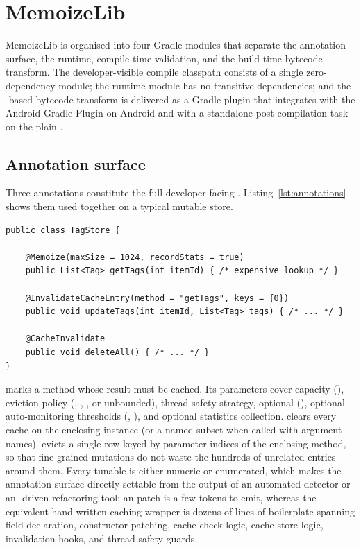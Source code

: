\section{MemoizeLib}\label{sec:tool}

MemoizeLib is organised into four Gradle modules that separate the annotation surface, the runtime, compile-time validation, and the build-time bytecode transform. The developer-visible compile classpath consists of a single zero-dependency module; the runtime module has no transitive dependencies; and the \asm-based bytecode transform is delivered as a Gradle plugin that integrates with the Android Gradle Plugin on Android and with a standalone post-compilation task on the plain \jvm.

\subsection{Annotation surface}\label{sec:annotations}

Three annotations constitute the full developer-facing \api. Listing~\ref{lst:annotations} shows them used together on a typical mutable store.

\begin{lstlisting}[caption={All three annotations used together.},label={lst:annotations}]
public class TagStore {

    @Memoize(maxSize = 1024, recordStats = true)
    public List<Tag> getTags(int itemId) { /* expensive lookup */ }

    @InvalidateCacheEntry(method = "getTags", keys = {0})
    public void updateTags(int itemId, List<Tag> tags) { /* ... */ }

    @CacheInvalidate
    public void deleteAll() { /* ... */ }
}
\end{lstlisting}

 marks a method whose result must be cached. Its parameters cover capacity (), eviction policy (, , , or unbounded), thread-safety strategy, optional \ttl (), optional auto-monitoring thresholds (, ), and optional statistics collection.  clears every cache on the enclosing instance (or a named subset when called with argument names).  evicts a single row keyed by parameter indices of the enclosing method, so that fine-grained mutations do not waste the hundreds of unrelated entries around them. Every tunable is either numeric or enumerated, which makes the annotation surface directly settable from the output of an automated detector or an \llm-driven refactoring tool: an  patch is a few tokens to emit, whereas the equivalent hand-written caching wrapper is dozens of lines of boilerplate spanning field declaration, constructor patching, cache-check logic, cache-store logic, invalidation hooks, and thread-safety guards.

